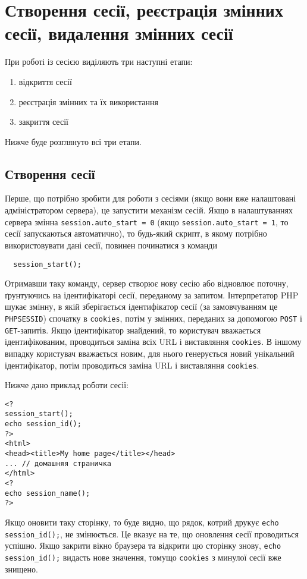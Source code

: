 \section{Створення сесії, реєстрація змінних сесії, видалення змінних сесії}
При роботі із сесією виділяють три наступні етапи:
\begin{enumerate}
\item відкриття сесії
\item реєстрація змінних та їх використання
\item закриття сесії
\end{enumerate}
Нижче буде розглянуто всі три етапи.

\subsection*{Створення сесії}
Перше, що потрібно зробити для роботи з сесіями (якщо вони вже налаштовані адміністратором сервера), це запустити механізм сесій. Якщо в налаштуваннях сервера змінна \verb'session.auto_start = 0' (якщо \verb'session.auto_start = 1', то сесії запускаються автоматично), то будь-який скрипт, в якому потрібно використовувати дані сесії, повинен починатися з команди
\begin{verbatim}
  session_start(); 
\end{verbatim}

Отримавши таку команду, сервер створює нову сесію або відновлює поточну, ґрунтуючись на ідентифікаторі сесії, переданому за запитом.  Інтерпретатор PHP шукає змінну, в якій зберігається ідентифікатор сесії (за замовчуванням це \verb'PHPSESSID') спочатку в \verb'cookies', потім у змінних, переданих за допомогою \verb'POST' і \verb'GET'-запитів. Якщо ідентифікатор знайдений, то користувач вважається ідентифікованим, проводиться заміна всіх URL і виставляння \verb'cookies'. В іншому випадку користувач вважається новим, для нього генерується новий унікальний ідентифікатор, потім проводиться заміна URL і виставляння \verb'cookies'.

Нижче дано приклад роботи сесії:

\begin{verbatim}
<?
session_start(); 
echo session_id(); 
?>
<html>
<head><title>My home page</title></head>
... // домашняя страничка
</html>
<?
echo session_name(); 
?>
\end{verbatim}

Якщо оновити таку сторінку, то буде видно, що рядок, котрий друкує \verb'echo session_id();', не змінюється. Це вказує на те, що оновлення сесії проводиться успішно. Якщо закрити вікно браузера та відкрити цю сторінку знову, \verb'echo session_id();' видасть нове значення, томущо \verb'cookies' з минулої сесії вже знищено.


